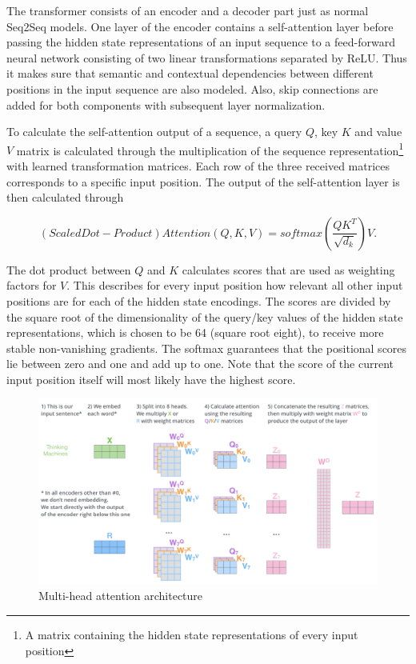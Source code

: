 The transformer consists of an encoder and a decoder part just as normal \ac{Seq2Seq} models. One layer of the encoder contains a self-attention layer before passing the hidden state representations of an input sequence to a feed-forward neural network consisting of two linear trans\-for\-ma\-ti\-ons separated by \ac{ReLU}. Thus it makes sure that semantic and contextual dependencies between different positions in the input sequence are also modeled. Also, skip connections are added for both components with subsequent layer normalization. \cite{Alammar2018, Vaswani2017}

To calculate the self-attention output of a sequence, a query $Q$, key $K$ and value $V$ matrix is calculated through the multiplication of the sequence representation\footnote{A matrix containing the hidden state representations of every input position} with learned transformation matrices. Each row of the three received matrices corresponds to a specific input position. The output of the self-attention layer is then calculated through

\begin{equation}
	(Scaled Dot-Product) Attention(Q, K, V) = softmax(\frac{QK^T}{\sqrt{d_k}})V.
\end{equation}

The dot product between $Q$ and $K$ calculates scores that are used as weighting factors for $V$. This describes for every input position how relevant all other input positions are for each of the hidden state encodings. The scores are divided by the square root of the dimensionality of the query/key values of the hidden state representations, which is chosen to be 64 (square root eight), to receive more stable non-vanishing gradients. The softmax guarantees that the positional scores lie between zero and one and add up to one. Note that the score of the current input position itself will most likely have the highest score. \cite{Alammar2018, Vaswani2017}

\begin{figure}[ht]
	\centering
	\includegraphics[width=\linewidth]{figures/multi_head_attention.png}
	\caption{Multi-head attention architecture \cite{Alammar2018}}
	\label{multi-head-attention}
\end{figure}

